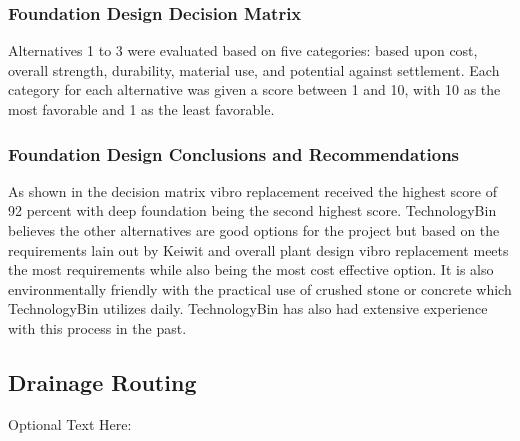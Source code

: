 \documentclass{ceri}
\begin{document}
\subsubsection{Foundation Design Decision Matrix}
Alternatives 1 to 3 were evaluated based on five categories: based upon cost, overall strength, durability, material use, and potential against settlement. Each category for each 	alternative was given a score between 1 and 10, with 10 as the most favorable and 1 as the least favorable. 
    
	\begin{table}[H]
	\centering
	\caption{Foundation Design Decision Matrix}
\label{my-label}
	\end{table}
    
\subsubsection{Foundation Design Conclusions and Recommendations}
As shown in the decision matrix vibro replacement received the highest score of 92 percent with deep foundation being the second highest score. TechnologyBin believes the other alternatives are good options for the project but based on the requirements lain out by Keiwit and overall plant design vibro replacement meets the most requirements while also being the most cost effective option. It is also environmentally friendly with the practical use of crushed stone or concrete which TechnologyBin utilizes daily. TechnologyBin has also had extensive experience with this process in the past. 
\newpage
\subsection{Drainage Routing}
Optional Text Here:
\end{document}
